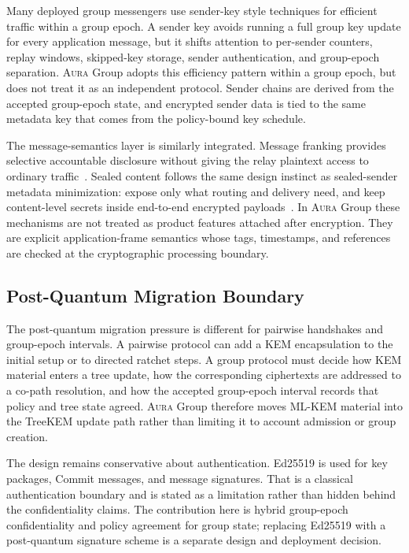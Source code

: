 \documentclass[preprint,12pt]{elsarticle}
\theoremstyle{definition}
\newcommand{\Aura}{\textsc{Aura}}
\begin{document}
Many deployed group messengers use sender-key style techniques for efficient
traffic within a group epoch. A sender key avoids running a full group key update for
every application message, but it shifts attention to per-sender counters,
replay windows, skipped-key storage, sender authentication, and group-epoch
separation. \Aura{} Group adopts this efficiency pattern within a group epoch, but
does not treat it as an independent protocol. Sender chains are derived from
the accepted group-epoch state, and encrypted sender data is tied to the same
metadata key that comes from the policy-bound key schedule.

The message-semantics layer is similarly integrated. Message franking provides
selective accountable disclosure without giving the relay plaintext access to
ordinary traffic~\cite{franking}. Sealed content follows the same design
instinct as sealed-sender metadata minimization: expose only what routing and
delivery need, and keep content-level secrets inside end-to-end encrypted
payloads~\cite{sealed-sender}. In \Aura{} Group these mechanisms are not
treated as product features attached after encryption. They are explicit
application-frame semantics whose tags, timestamps, and references are checked
at the cryptographic processing boundary.

\subsection{Post-Quantum Migration Boundary}

The post-quantum migration pressure is different for pairwise handshakes and
group-epoch intervals. A pairwise protocol can add a KEM encapsulation to the initial
setup or to directed ratchet steps. A group protocol must decide how KEM
material enters a tree update, how the corresponding ciphertexts are addressed
to a co-path resolution, and how the accepted group-epoch interval records that policy and
tree state agreed. \Aura{} Group therefore moves ML-KEM material into the
TreeKEM update path rather than limiting it to account admission or group
creation.

The design remains conservative about authentication. Ed25519 is used for key
packages, Commit messages, and message signatures. That is a classical authentication
boundary and is stated as a limitation rather than hidden behind the
confidentiality claims. The contribution here is hybrid
group-epoch confidentiality and policy agreement for group state; replacing Ed25519
with a post-quantum signature scheme is a separate design and deployment
decision.
\end{document}
